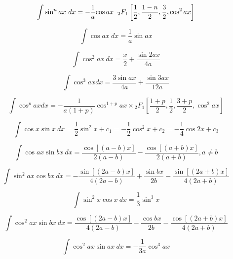 \documentclass[12pt,letterpaper,leqno]{article}
\begin{document}
\begin{equation}
\int \sin^n ax \ dx =
 -\frac{1}{a}{\cos ax} \hspace{2mm}{_2F_1}\left[
\frac{1}{2}, \frac{1-n}{2}, \frac{3}{2}, \cos^2 ax
\right] 
\end{equation}



\begin{equation}
\int \cos ax\ dx= \frac{1}{a} \sin ax 
\end{equation}

\begin{equation}
\int \cos^2 ax\ dx = \frac{x}{2}+\frac{ \sin 2ax}{4a} 
\end{equation}

\begin{equation}
\int \cos^3 ax dx = \frac{3 \sin ax}{4a}+\frac{ \sin 3ax}{12a} 
\end{equation}

\begin{equation}
\int \cos^p ax dx  = -\frac{1}{a(1+p)}{\cos^{1+p} ax} \times 
{_2F_1}\left[
\frac{1+p}{2}, \frac{1}{2}, \frac{3+p}{2}, \cos^2 ax
\right] 
\end{equation}

\begin{equation}\label{eq:veky}
\int \cos x \sin x\ dx = \frac{1}{2}\sin^2 x + c_1 = -\frac{1}{2} \cos^2x + c_2 = -\frac{1}{4} \cos 2x + c_3
\end{equation}

\begin{equation}
\int \cos ax \sin bx\ dx = \frac{\cos[(a-b) x]}{2(a-b)} -
 \frac{\cos[(a+b)x]}{2(a+b)} , a\ne b
\end{equation}

\begin{equation}
\int \sin^2 ax \cos bx\ dx = 
-\frac{\sin[(2a-b)x]}{4(2a-b)} 
+ \frac{\sin bx}{2b} 
- \frac{\sin[(2a+b)x]}{4(2a+b)}
\end{equation}

\begin{equation}
\int \sin^2 x \cos x\ dx = \frac{1}{3} \sin^3 x
\end{equation}

\begin{equation}
\int \cos^2 ax \sin bx\ dx = \frac{\cos[(2a-b)x]}{4(2a-b)} 
- \frac{\cos bx}{2b}
 - \frac{\cos[(2a+b)x]}{4(2a+b)}
\end{equation}

\begin{equation}
\int \cos^2 ax \sin ax\ dx = -\frac{1}{3a}\cos^3{ax} 
\end{equation}
\end{document}
